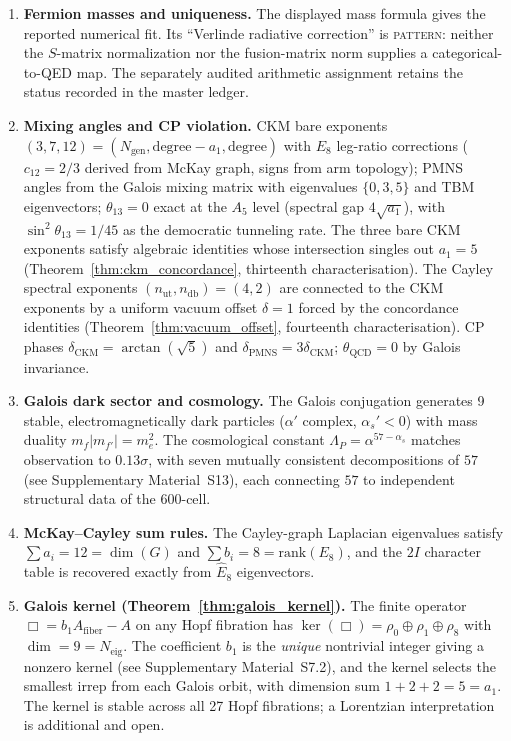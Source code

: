 \documentclass[12pt,a4paper]{article}
\theoremstyle{definition}
\begin{document}
\begin{enumerate}
\item \textbf{Fermion masses and uniqueness.}  The displayed mass formula gives the reported numerical fit.  Its ``Verlinde radiative correction'' is \textsc{pattern}: neither the \(S\)-matrix normalization nor the fusion-matrix norm supplies a categorical-to-QED map.  The separately audited arithmetic assignment retains the status recorded in the master ledger.

\item \textbf{Mixing angles and CP violation.}  CKM bare exponents $(3,7,12) = (N_{\text{gen}}, \text{degree}-a_1, \text{degree})$ with $E_8$ leg-ratio corrections ($c_{12} = 2/3$ derived from McKay graph, signs from arm topology); PMNS angles from the Galois mixing matrix with eigenvalues $\{0, 3, 5\}$ and TBM eigenvectors; $\theta_{13} = 0$ exact at the $A_5$ level (spectral gap $4\sqrt{a_1}$), with $\sin^2\theta_{13} = 1/45$ as the democratic tunneling rate.  The three bare CKM exponents satisfy algebraic identities whose intersection singles out $a_1 = 5$ (Theorem~\ref{thm:ckm_concordance}, thirteenth characterisation).  The Cayley spectral exponents $(n_{\text{ut}}, n_{\text{db}}) = (4, 2)$ are connected to the CKM exponents by a uniform vacuum offset $\delta = 1$ forced by the concordance identities (Theorem~\ref{thm:vacuum_offset}, fourteenth characterisation).  CP phases $\delta_{\text{CKM}} = \arctan(\sqrt{5})$ and $\delta_{\text{PMNS}} = 3\delta_{\text{CKM}}$; $\theta_{\text{QCD}} = 0$ by Galois invariance.

\item \textbf{Galois dark sector and cosmology.}  The Galois conjugation generates 9 stable, electromagnetically dark particles ($\alpha'$ complex, $\alpha_s' < 0$) with mass duality $m_f |m_{f'}| = m_e^2$.  The cosmological constant $\Lambda_P = \alpha^{57-\alpha_s}$ matches observation to $0.13\sigma$, with seven mutually consistent decompositions of $57$ (see Supplementary Material~S13), each connecting $57$ to independent structural data of the 600-cell.

\item \textbf{McKay--Cayley sum rules.}  The Cayley-graph Laplacian eigenvalues satisfy $\sum a_i = 12 = \dim(G)$ and $\sum b_i = 8 = \text{rank}(E_8)$, and the $2I$ character table is recovered exactly from $\hat{E}_8$ eigenvectors.

\item \textbf{Galois kernel (Theorem~\ref{thm:galois_kernel}).}  The finite operator $\Box = b_1 A_{\text{fiber}} - A$ on any Hopf fibration has $\ker(\Box) = \rho_0 \oplus \rho_1 \oplus \rho_8$ with $\dim = 9 = N_{\text{eig}}$.  The coefficient $b_1$ is the \emph{unique} nontrivial integer giving a nonzero kernel (see Supplementary Material~S7.2), and the kernel selects the smallest irrep from each Galois orbit, with dimension sum $1 + 2 + 2 = 5 = a_1$.  The kernel is stable across all 27 Hopf fibrations; a Lorentzian interpretation is additional and open.
\end{enumerate}
\end{document}
